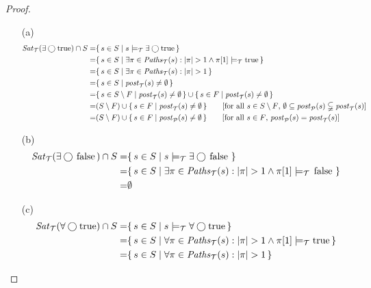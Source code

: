 \documentclass[12pt]{article}
\newcommand{\nxt}{\bigcirc}
\newcommand{\TRUE}{\mbox{\lstinline{true}}}
\newcommand{\FALSE}{\mbox{\lstinline{false}}}
\theoremstyle{definition}
\newcommand{\comment}[1]{\hspace{2em}[\mbox{#1}]}
\begin{document}
\begin{proof}\
\begin{itemize}
\item[(a)]
\begin{align*}
\mathit{Sat}_{\mathcal{T}}(\exists \nxt \TRUE) \cap S
= & \{\, s \in S \mid s \models_{\mathcal{T}} \exists \nxt \TRUE \,\}\\
= & \{\, s \in S \mid \exists \pi \in \mathit{Paths}_{\mathcal{T}}(s) : |\pi| > 1 \wedge \pi[1] \models_{\mathcal{T}} \TRUE \,\}\\
= & \{\, s \in S \mid \exists \pi \in \mathit{Paths}_{\mathcal{T}}(s) : |\pi| > 1 \,\}\\
= & \{\, s \in S \mid \mathit{post}_{\mathcal{T}}(s) \not= \emptyset \,\}\\
= & \{\, s \in S \setminus F \mid \mathit{post}_{\mathcal{T}}(s) \not= \emptyset \,\} \cup \{\, s \in F \mid \mathit{post}_{\mathcal{T}}(s) \not= \emptyset \,\}\\
= & (S \setminus F) \cup \{\, s \in F \mid \mathit{post}_{\mathcal{T}}(s) \not= \emptyset \,\}
\comment{for all $s \in S \setminus F$, $\emptyset \subseteq \mathit{post}_{\mathcal{P}}(s) \subsetneqq \mathit{post}_{\mathcal{T}}(s)$}\\
= & (S \setminus F) \cup \{\, s \in F \mid \mathit{post}_{\mathcal{P}}(s) \not= \emptyset \,\}
\comment{for all $s \in F$, $\mathit{post}_{\mathcal{P}}(s) = \mathit{post}_{\mathcal{T}}(s)$}
\end{align*}
\item[(b)]
\begin{align*}
\mathit{Sat}_{\mathcal{T}}(\exists \nxt \FALSE) \cap S
= & \{\, s \in S \mid s \models_{\mathcal{T}} \exists \nxt \FALSE \,\}\\
= & \{\, s \in S \mid \exists \pi \in \mathit{Paths}_{\mathcal{T}}(s) : |\pi| > 1 \wedge \pi[1] \models_{\mathcal{T}} \FALSE \,\}\\
= & \emptyset
\end{align*}
\item[(c)]
\begin{align*}
\mathit{Sat}_{\mathcal{T}}(\forall \nxt \TRUE) \cap S
= & \{\, s \in S \mid s \models_{\mathcal{T}} \forall \nxt \TRUE \,\}\\
= & \{\, s \in S \mid \forall \pi \in \mathit{Paths}_{\mathcal{T}}(s) : |\pi| > 1 \wedge \pi[1] \models_{\mathcal{T}} \TRUE \,\}\\
= & \{\, s \in S \mid \forall \pi \in \mathit{Paths}_{\mathcal{T}}(s) : |\pi| > 1 \,\}\\

\end{align*}
\end{itemize}
\end{proof}
\end{document}
